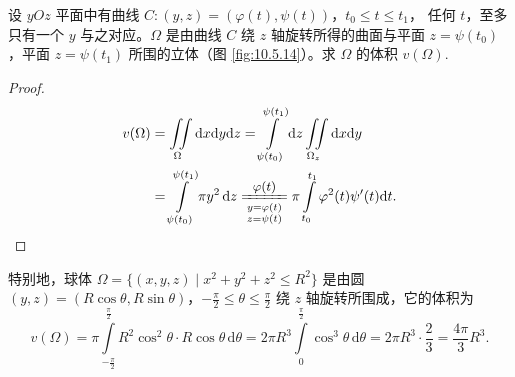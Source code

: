\begin{example}[旋转体体积]\label{ex:10.5.4}
设 $yOz$ 平面中有曲线 $C\colon (y, z) = (\varphi(t), \psi(t))$，$t_0 \leqslant t \leqslant t_1$，
任何 $t$，至多只有一个 $y$ 与之对应。$\Omega$ 是由曲线 $C$ 绕 $z$ 轴旋转所得的曲面与平面
$z = \psi(t_0)$，平面 $z = \psi(t_1)$ 所围的立体（图 \ref{fig:10.5.14}）。求 $\Omega$ 的体积 $v(\Omega)$.
\end{example}

\begin{proof}
\begin{align*}
v(\Omega)
&= \iint \limits_{\Omega} \mathrm{d}x \mathrm{d}y \mathrm{d}z
 = \int \limits_{\psi(t_0)}^{\psi(t_1)} \mathrm{d}z \iint \limits_{\Omega_z} \mathrm{d}x \mathrm{d}y \notag\\
&= \int \limits_{\psi(t_0)}^{\psi(t_1)} \pi y^2 \, \mathrm{d}z
 \reasonb{$\varphi(t)$} {\substack{y = \varphi(t)\\ z = \psi(t)}}
   \pi \int \limits_{t_0}^{t_1} \varphi^2(t) \psi'(t) \mathrm{d}t.
\end{align*}
\end{proof}

特别地，球体 $\Omega = \{(x, y, z) \mid x^2 + y^2 + z^2 \leqslant R^2\}$ 是由圆
$(y, z) = (R\cos\theta, R\sin\theta)$，$-\frac{\pi}{2} \leqslant \theta \leqslant \frac{\pi}{2}$
绕 $z$ 轴旋转所围成，它的体积为
\[
v(\Omega) = \pi \int \limits_{-\frac{\pi}{2}}^{\frac{\pi}{2}} R^2 \cos^2\theta \cdot R\cos\theta \, \mathrm{d}\theta
= 2\pi R^3 \int \limits_0^{\frac{\pi}{2}} \cos^3\theta \, \mathrm{d}\theta
= 2\pi R^3 \cdot \frac{2}{3} = \frac{4\pi}{3} R^3.
\]

